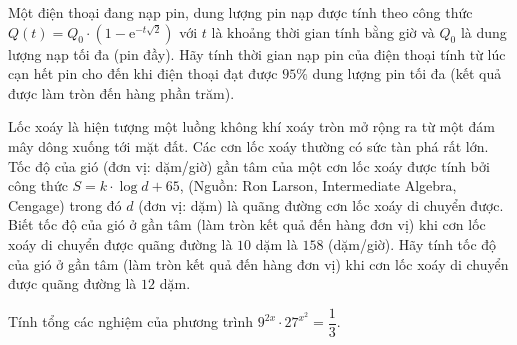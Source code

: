 \begin{bt}%

	Một điện thoại đang nạp pin, dung lượng pin nạp được tính theo công thức $Q(t)=Q_0\cdot (1-\mathrm{e}^{-t\sqrt2})$ với $t$ là khoảng thời gian tính bằng giờ và $Q_0$ là dung lượng nạp tối đa (pin đầy). Hãy tính thời gian nạp pin của điện thoại tính từ lúc cạn hết pin cho đến khi điện thoại đạt được $95\%$ dung lượng pin tối đa (kết quả được làm tròn đến hàng phần trăm).
\end{bt}

\begin{bt}%

	Lốc xoáy là hiện tượng một luồng không khí xoáy tròn mở rộng ra từ một đám mây dông xuống tới mặt đất. Các cơn lốc xoáy thường có sức tàn phá rất lớn. Tốc độ của gió (đơn vị: dặm/giờ) gần tâm của một cơn lốc xoáy được tính bởi công thức $S=k\cdot \log d+65$, (Nguồn: Ron Larson, Intermediate Algebra, Cengage) trong đó $d$ (đơn vị: dặm) là quãng đường cơn lốc xoáy di chuyển được. Biết  tốc độ của gió ở gần tâm (làm tròn kết quả đến hàng đơn vị) khi cơn lốc xoáy di chuyển được quãng đường là $10$ dặm là $158$ (dặm/giờ). Hãy tính tốc độ của gió ở gần tâm (làm tròn kết quả đến hàng đơn vị) khi cơn lốc xoáy di chuyển được quãng đường là $12$ dặm.
\end{bt}

\begin{bt}%

	Tính tổng các nghiệm của phương trình $9^{2x}\cdot 27^{x^2}=\dfrac{1}{3}$.
\end{bt}

